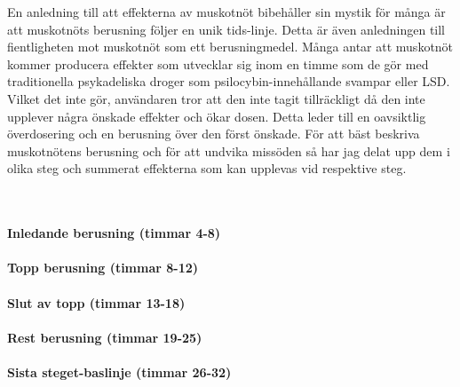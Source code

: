 En anledning till att effekterna av muskotnöt bibehåller sin mystik för många är att muskotnöts berusning följer en unik tids-linje. Detta är även anledningen till fientligheten mot muskotnöt som ett berusningmedel. Många antar att muskotnöt kommer producera effekter som utvecklar sig inom en timme som de gör med traditionella psykadeliska droger som psilocybin-innehållande svampar eller LSD. Vilket det inte gör, användaren tror att den inte tagit tillräckligt då den inte upplever några önskade effekter och ökar dosen. Detta leder till en oavsiktlig överdosering och en berusning över den först önskade. För att bäst beskriva muskotnötens berusning och för att undvika missöden så har jag delat upp dem i olika steg och summerat effekterna som kan upplevas vid respektive steg.

\\

\paragraph{Inledande berusning (timmar 4-8)}

\paragraph{Topp berusning (timmar 8-12)}

\paragraph{Slut av topp (timmar 13-18)}

\paragraph{Rest berusning (timmar 19-25)}

\paragraph{Sista steget-baslinje (timmar 26-32)}










